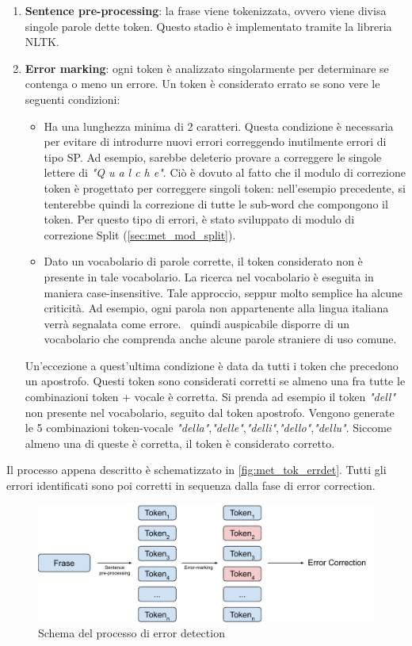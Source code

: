 \begin{enumerate}
\item \textbf{Sentence pre-processing}: la frase viene tokenizzata, ovvero viene divisa singole parole dette token. Questo stadio è implementato tramite la libreria NLTK\cite{nltk}.
\item \textbf{Error marking}: ogni token è analizzato singolarmente per determinare se contenga o meno un errore. Un token è considerato errato se sono vere le seguenti condizioni:
	\begin{itemize}
	\item Ha una lunghezza minima di 2 caratteri. Questa condizione è necessaria per evitare di introdurre nuovi errori correggendo inutilmente errori di tipo SP. Ad esempio, sarebbe deleterio provare a correggere le singole lettere di \textit{"Q u a l c h e"}. Ciò è dovuto al fatto che il modulo di correzione token è progettato per correggere singoli token: nell'esempio precedente, si tenterebbe quindi la correzione di tutte le sub-word che compongono il token. Per questo tipo di errori, è stato sviluppato di modulo di correzione Split (\autoref{sec:met_mod_split}).
	
	\item Dato un vocabolario di parole corrette, il token considerato non è presente in tale vocabolario. La ricerca nel vocabolario è eseguita in maniera case-insensitive. Tale approccio, seppur molto semplice ha alcune criticità. Ad esempio, ogni parola non appartenente alla lingua italiana verrà segnalata come errore. \E\ quindi auspicabile disporre di un vocabolario che comprenda anche alcune parole straniere di uso comune.
	\end{itemize}
Un'eccezione a quest'ultima condizione è data da tutti i token che precedono un apostrofo. Questi token sono considerati corretti se almeno una fra tutte le combinazioni token + vocale è corretta. Si prenda ad esempio il token \textit{"dell"} non presente nel vocabolario, seguito dal token apostrofo. Vengono generate le 5 combinazioni token-vocale \textit{"della"},\textit{"delle"},\textit{"delli"},\textit{"dello"},\textit{"dellu"}. Siccome almeno una di queste è corretta, il token è considerato corretto.
\end{enumerate}

Il processo appena descritto è schematizzato in \autoref{fig:met_tok_errdet}. Tutti gli errori identificati sono poi corretti in sequenza dalla fase di error correction. 

\begin{figure}[H]
\centering
\includegraphics[width=\textwidth]{immagini/metodologia/error_detection}
\caption{Schema del processo di error detection}
\label{fig:met_tok_errdet}
\end{figure}

